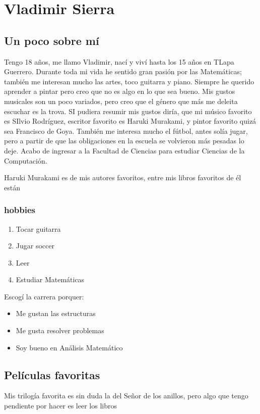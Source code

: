 
\chapter{Vladimir Sierra}



\section{Un poco sobre mí}

Tengo 18 años, me llamo Vladimir, nací y viví hasta los 15 años en TLapa Guerrero.
Durante toda mi vida he sentido gran pasión por las Matemáticas; también me interesan mucho las artes, toco guitarra y piano. Siempre he querido aprender a pintar pero creo que no es algo en lo que sea bueno.
Mis gustos musicales son un poco variados, pero creo que el género que más me deleita escuchar es la trova.
SI pudiera resumir mis gustos diría, que mi músico favorito es SIlvio Rodríguez, escritor favorito es Haruki Murakami, y pintor favorito quizá sea Francisco de Goya.
También me interesa mucho el fútbol, antes solía jugar, pero a partir de que las obligaciones en la escuela se volvieron más pesadas lo deje.
Acabo de ingresar a la Facultad de Ciencias para estudiar Ciencias de la Computación.

Haruki Murakami es de mis autores favoritos, entre mis libros favoritos de él están 

\subsection {hobbies}
\begin{enumerate}
\item Tocar guitarra
\item Jugar soccer
\item Leer
\item Estudiar Matemáticas
\end{enumerate}  

Escogí la carrera porquer: 


\begin{itemize}
\item Me gustan las estructuras
\item Me gusta resolver problemas
  \item Soy bueno en Análisis Matemático
 \end{itemize}

\newpage

    \section{Películas favoritas}
    Mis trilogía favorita es sin duda la del Señor de los anillos, pero algo que tengo pendiente por hacer es leer los libros~\cite{torres,comunidad,retorno}
    
